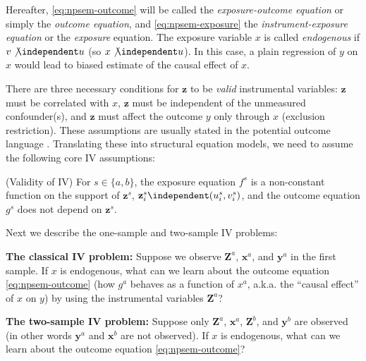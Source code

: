 \documentclass[preprint]{imsart}
\begin{document}
Hereafter, \eqref{eq:npsem-outcome} will be called the \emph{exposure-outcome
  equation} or simply the \emph{outcome equation}, and \eqref{eq:npsem-exposure} the \emph{instrument-exposure
  equation} or the \emph{exposure} equation. The exposure variable $x$
is called \emph{endogenous} if
$v \not \independent u$ (so $x \not \independent u$). In this case, a
plain regression of $y$ on $x$ would lead to biased estimate of the
causal effect of $x$.

There are three necessary conditions for $\mathbf{z}$ to be
\emph{valid} instrumental variables:
$\mathbf{z}$ must be correlated with $x$, $\mathbf{z}$ must be
independent of the unmeasured confounder(s), and $\mathbf{z}$ must affect
the outcome $y$ only through $x$ (exclusion restriction). These
assumptions are usually stated in the potential outcome language
\citep{angrist1996identification}. Translating these into structural
equation models, we need to assume the following core IV assumptions:
\begin{assumption} \label{assump:valid-iv}
  (Validity of IV) For $s \in \{a,b\}$, the exposure equation $f^s$ is
  a non-constant function on the support of $\mathbf{z}^s$, $\mathbf{z}_i^s \independent
  (u_i^s,v_i^s)$, and the outcome equation $g^s$ does not depend on
  $\mathbf{z}^s$.
\end{assumption}

Next we describe the one-sample and two-sample IV problems:

{\noindent \bf The classical IV problem:} Suppose we observe
$\mathbf{Z}^a$, $\mathbf{x}^a$, and $\mathbf{y}^a$ in the first
sample. If $x$ is endogenous, what can we learn about the outcome
equation \eqref{eq:npsem-outcome} (how $g^a$ behaves as a function of
$x^a$, a.k.a. the ``causal effect'' of $x$ on $y$) by using the
instrumental variables $\mathbf{Z}^{a}$?

{\noindent \bf The two-sample IV problem:} Suppose
only $\mathbf{Z}^a$, $\mathbf{x}^a$, $\mathbf{Z}^b$, and
$\mathbf{y}^b$ are observed (in other words $\mathbf{y}^a$ and
$\mathbf{x}^b$ are not observed). If $x$ is endogenous, what can we
learn about the outcome equation \eqref{eq:npsem-outcome}?
\end{document}
